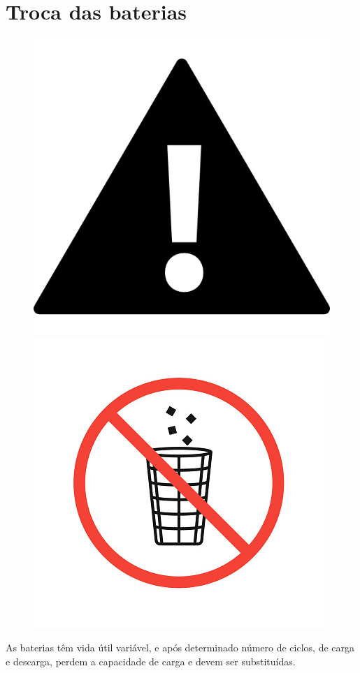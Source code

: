 \section*{Troca das baterias}
\begin{figure}[H]
\centering
	\label{iconeimportante}
		\includegraphics[keepaspectratio=true,scale=1.7]{Figuras/bateria/iconeimportante.png}
		\includegraphics[keepaspectratio=true,scale=0.5]{Figuras/bateria/iconelixo.jpg}
	\label{iconeimportante}
	\end{figure} 
As baterias têm vida útil variável, e após determinado número de ciclos, de carga e descarga, perdem a capacidade de carga e devem ser substituídas.


